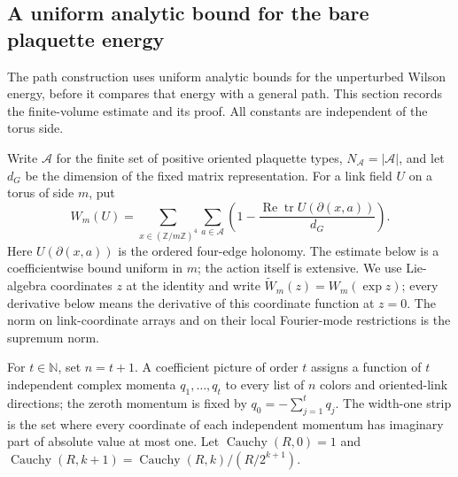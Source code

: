 \subsection{A uniform analytic bound for the bare plaquette energy}
\label{sec:ex-wilson-vacuum-price}

The path construction uses uniform analytic bounds for the unperturbed Wilson
energy, before it compares that energy with a general path. This section
records the finite-volume estimate and its proof. All constants are independent
of the torus side.

Write $\mathcal A$ for the finite set of positive oriented plaquette types,
$N_{\mathcal A}=|\mathcal A|$, and let $d_G$ be the dimension of the fixed
matrix representation. For a link field $U$ on a torus of side $m$, put
\[
 W_m(U)=\sum_{x\in(\mathbb Z/m\mathbb Z)^4}\sum_{a\in\mathcal A}
       \left(1-\frac{\operatorname{Re}\operatorname{tr}U(\partial(x,a))}{d_G}\right).
\]
Here $U(\partial(x,a))$ is the ordered four-edge holonomy. The estimate below
is a coefficientwise bound uniform in $m$; the action itself is extensive.
We use Lie-algebra coordinates $z$ at the identity and write
$\widetilde W_m(z)=W_m(\exp z)$; every derivative below means the derivative
of this coordinate function at $z=0$. The norm on link-coordinate arrays and
on their local Fourier-mode restrictions is the supremum norm.

For $t\in\mathbb N$, set $n=t+1$. A coefficient picture of order $t$ assigns a
function of $t$ independent complex momenta $q_1,\ldots,q_t$ to every list
of $n$ colors and oriented-link directions; the zeroth momentum is fixed by
$q_0=-\sum_{j=1}^tq_j$. The width-one strip is the set where every
coordinate of each independent momentum has imaginary part of absolute value
at most one. Let
$\operatorname{Cauchy}(R,0)=1$ and
$\operatorname{Cauchy}(R,k+1)=\operatorname{Cauchy}(R,k)/(R/2^{k+1})$.

